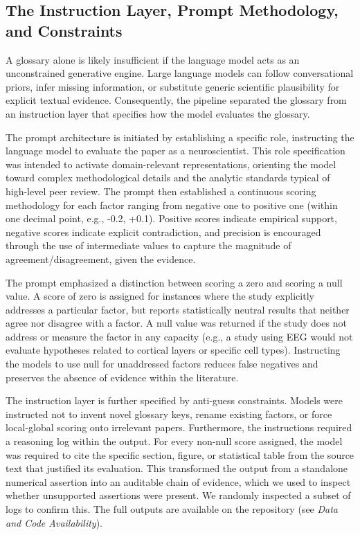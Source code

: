 \documentclass[12pt]{article}
\begin{document}
\subsection{The Instruction Layer, Prompt Methodology, and Constraints}\label{the-instruction-layer-prompt-methodology-and-constraints}

A glossary alone is likely insufficient if the language model acts as an unconstrained generative engine\cite{ref58}. Large language models can follow conversational priors, infer missing information, or substitute generic scientific plausibility for explicit textual evidence\cite{ref82}. Consequently, the pipeline separated the glossary from an instruction layer that specifies how the model evaluates the glossary.

The prompt architecture is initiated by establishing a specific role, instructing the language model to evaluate the paper as a neuroscientist. This role specification was intended to activate domain-relevant representations\cite{ref58}, orienting the model toward complex methodological details and the analytic standards typical of high-level peer review. The prompt then established a continuous scoring methodology for each factor ranging from negative one to positive one (within one decimal point, e.g., -0.2, +0.1). Positive scores indicate empirical support, negative scores indicate explicit contradiction, and precision is encouraged through the use of intermediate values to capture the magnitude of agreement/disagreement, given the evidence.

The prompt emphasized a distinction between scoring a zero and scoring a null value. A score of zero is assigned for instances where the study explicitly addresses a particular factor, but reports statistically neutral results that neither agree nor disagree with a factor. A null value was returned if the study does not address or measure the factor in any capacity (e.g., a study using EEG would not evaluate hypotheses related to cortical layers or specific cell types). Instructing the models to use null for unaddressed factors reduces false negatives and preserves the absence of evidence within the literature.

The instruction layer is further specified by anti-guess constraints. Models were instructed not to invent novel glossary keys, rename existing factors, or force local-global scoring onto irrelevant papers. Furthermore, the instructions required a reasoning log within the output. For every non-null score assigned, the model was required to cite the specific section, figure, or statistical table from the source text that justified its evaluation. This transformed the output from a standalone numerical assertion into an auditable chain of evidence, which we used to inspect whether unsupported assertions were present. We randomly inspected a subset of logs to confirm this. The full outputs are available on the repository (see \emph{Data and Code Availability}).
\end{document}
